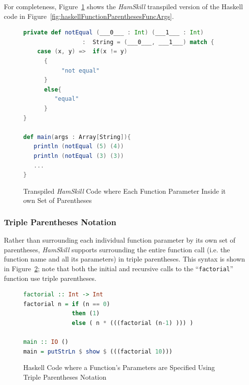 \documentclass{report}
\begin{document}
For completeness, Figure~\ref{fig:scalaFunctionParenthesesFuncArgs} shows the \textit{HamSkill} transpiled version of the Haskell code in Figure~\ref{fig:haskellFunctionParenthesesFuncArgs}.

\begin{figure}[H]
\begin{mdframed}
\begin{lstlisting}[language=Scala, showstringspaces=false]
private def notEqual (___0___ : Int) (___1___ : Int) 
                 :  String = (___0___, ___1___) match {
    case (x, y) =>  if(x != y)
      {
           "not equal"
      }
      else{
         "equal"
      }
} 
  
def main(args : Array[String]){
   println (notEqual (5) (4))
   println (notEqual (3) (3))
   ...
}
\end{lstlisting}
\end{mdframed}
\caption{Transpiled \textit{HamSkill} Code where Each Function Parameter Inside it own Set of Parentheses}\label{fig:scalaFunctionParenthesesFuncArgs}
\end{figure}

\subsubsection{Triple Parentheses Notation}

Rather than surrounding each individual function parameter by its own set of parentheses, \textit{HamSkill} supports surrounding the entire function call (i.e. the function name and all its parameters) in triple parentheses.  This syntax is shown in Figure~\ref{fig:haskellFunctionFactorial}; note that both the initial and recursive calls to the ``\texttt{factorial}'' function use triple parentheses.

\begin{figure}[H]
\begin{mdframed}
\begin{lstlisting}[language=Haskell]
factorial :: Int -> Int
factorial n = if (n == 0)
              then (1)
              else ( n * (((factorial (n-1) ))) )

main :: IO ()
main = putStrLn $ show $ (((factorial 10)))
\end{lstlisting}
\end{mdframed}
\caption{Haskell Code where a Function's Parameters are Specified Using Triple Parentheses Notation}\label{fig:haskellFunctionFactorial}
\end{figure}
\end{document}
